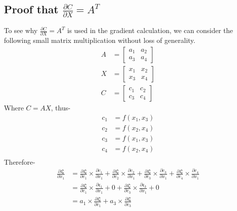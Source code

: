 \subsection*{Proof that $\frac{\partial C}{\partial X} = A^T$}
 To see why $\frac{\partial C}{\partial X} = A^T$ is used in the gradient calculation, we can consider the following small matrix multiplication without loss of generality.
\begin{align*}
A &= \begin{bmatrix}
a_1 & a_2 \\
a_3 & a_4
\end{bmatrix} \\ 
 X &= \begin{bmatrix}
x_1 & x_2 \\
x_3 & x_4
\end{bmatrix} \\
 C &=  \begin{bmatrix}
c_1 & c_2 \\
c_3 & c_4
\end{bmatrix}
\end{align*}
Where $C=AX$, thus-
\begin{align*}
c_1&=f(x_1, x_3) \\
c_2&=f(x_2, x_4) \\
c_3&=f(x_1, x_3) \\
c_4&=f(x_2, x_4) \\
\end{align*}
Therefore-
\begin{align*}
\frac{\partial \mathfrak{L}}{\partial x_1} &= \frac{\partial \mathfrak{L}}{\partial c_1} \times \frac{\partial c_1}{\partial x_1} + \frac{\partial \mathfrak{L}}{\partial c_2} \times \frac{\partial c_2}{\partial x_1} + \frac{\partial \mathfrak{L}}{\partial c_3} \times \frac{\partial c_3}{\partial x_1} + \frac{\partial \mathfrak{L}}{\partial c_4} \times \frac{\partial c_4}{\partial x_1}\\
&= \frac{\partial \mathfrak{L}}{\partial c_1} \times \frac{\partial \mathfrak{c_1}}{\partial x_1} + 0 + \frac{\partial \mathfrak{L}}{\partial c_3} \times \frac{\partial \mathfrak{c_3}}{\partial x_1} + 0\\
&= a_1 \times \frac{\partial \mathfrak{L}}{\partial c_1} + a_3 \times \frac{\partial \mathfrak{L}}{\partial c_3}\\
\end{align*}

